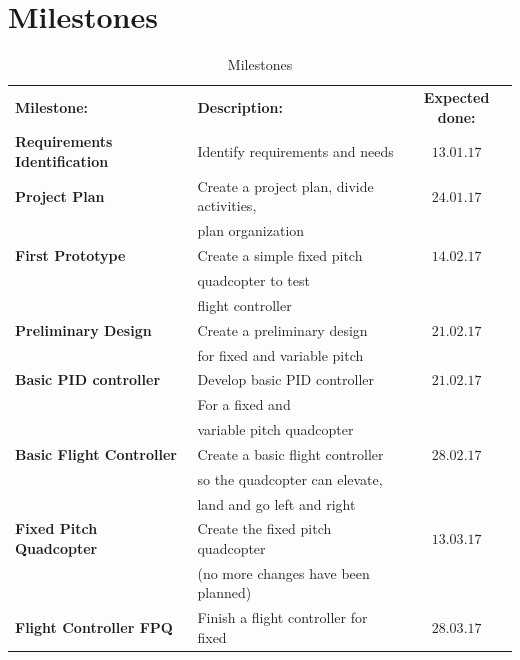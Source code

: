 \begin{table}[h]

\centering\section*{\textbf{Milestones}}
\caption{Milestones}
\begin{tabular}{llc}
\rowcolor{cadetgrey}
\centering \textbf{Milestone:}    &\textbf{Description:} 	 &\textbf{Expected done:} \\ %

\rowcolor{gainsboro}
\textbf{Requirements Identification} & Identify requirements and needs & $13.01.17$ \\
\textbf{Project Plan} & Create a project plan, divide activities, & $24.01.17$ \\
                                     & plan organization & \\
\rowcolor{gainsboro}
\textbf{First Prototype} & Create a simple fixed pitch & $14.02.17$ \\\rowcolor{gainsboro}
                         & quadcopter to test & \\\rowcolor{gainsboro}
                         & flight controller & \\
\textbf{Preliminary Design} & Create a preliminary design & $21.02.17$ \\
                            & for fixed and variable pitch & \\\rowcolor{gainsboro}
\textbf{Basic PID controller} & Develop basic PID controller & $21.02.17$ \\\rowcolor{gainsboro}
                                 & For a fixed and & \\\rowcolor{gainsboro}
                                 & variable pitch quadcopter & \\
\textbf{Basic Flight Controller} & Create a basic flight controller & $28.02.17$ \\
                                 & so the quadcopter can elevate, & \\
                                 & land and go left and right & \\\rowcolor{gainsboro}
\textbf{Fixed Pitch Quadcopter} & Create the fixed pitch quadcopter & $13.03.17$ \\\rowcolor{gainsboro}
                                & (no more changes have been planned) & \\
\textbf{Flight Controller FPQ}  & Finish a flight controller for fixed & $28.03.17$ \\

\end{tabular}
\end{table}
